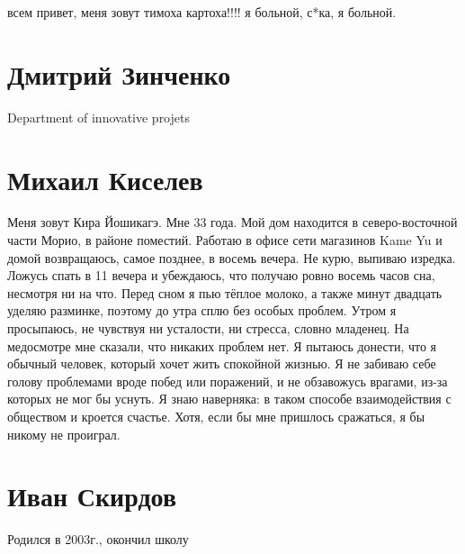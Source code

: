 \documentclass[labwork]{fefudoc}
\begin{document}
всем привет, меня зовут тимоха картоха!!!!
я больной, с*ка, я больной.


\section{Дмитрий Зинченко}
Department of innovative projets
\section{Михаил Киселев}
Меня зовут Кира Йошикагэ. Мне 33 года. Мой дом находится в северо-восточной части Морио, в районе поместий. Работаю в офисе сети магазинов Kame Yu и домой возвращаюсь, самое позднее, в восемь вечера.
Не курю, выпиваю изредка. Ложусь спать в 11 вечера и убеждаюсь, что получаю ровно восемь часов сна, несмотря ни на что. Перед сном я пью тёплое молоко, а также минут двадцать уделяю разминке, поэтому до утра сплю без особых проблем.
Утром я просыпаюсь, не чувствуя ни усталости, ни стресса, словно младенец. На медосмотре мне сказали, что никаких проблем нет. Я пытаюсь донести, что я обычный человек, который хочет жить спокойной жизнью. Я не забиваю себе голову проблемами вроде побед или поражений, и не обзавожусь врагами, из-за которых не мог бы уснуть. 
Я знаю наверняка: в таком способе взаимодействия с обществом и кроется счастье. Хотя, если бы мне пришлось сражаться, я бы никому не проиграл.
\section{Иван Скирдов}
Родился в 2003г., окончил школу %
\end{document}
